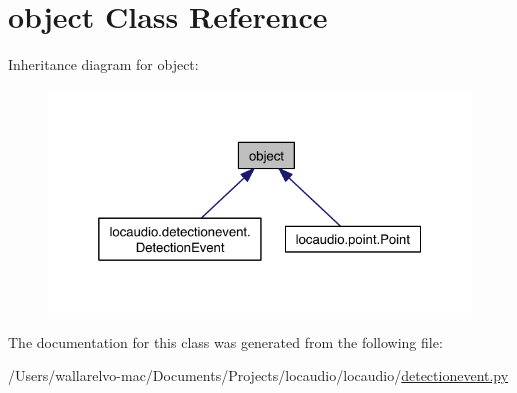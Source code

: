 \hypertarget{classobject}{\section{object Class Reference}
\label{classobject}
}


Inheritance diagram for object\-:
\nopagebreak
\begin{figure}[H]
\begin{center}
\leavevmode
\includegraphics[width=324pt]{classobject__inherit__graph}
\end{center}
\end{figure}


The documentation for this class was generated from the following file\-:\begin{DoxyCompactItemize}
\item 
/\-Users/wallarelvo-\/mac/\-Documents/\-Projects/locaudio/locaudio/\hyperlink{detectionevent_8py}{detectionevent.\-py}\end{DoxyCompactItemize}
